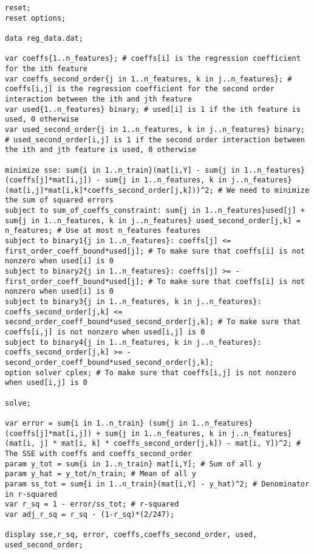 \documentclass[15pt,a4paper,openright]{article}
\begin{document}
\begin{lstlisting}[language=AMPL, caption=2g Code]
reset;
reset options;

data reg_data.dat;

var coeffs{1..n_features}; # coeffs[i] is the regression coefficient for the ith feature
var coeffs_second_order{j in 1..n_features, k in j..n_features}; # coeffs[i,j] is the regression coefficient for the second order interaction between the ith and jth feature
var used{1..n_features} binary; # used[i] is 1 if the ith feature is used, 0 otherwise
var used_second_order{j in 1..n_features, k in j..n_features} binary; # used_second_order[i,j] is 1 if the second order interaction between the ith and jth feature is used, 0 otherwise

minimize sse: sum{i in 1..n_train}(mat[i,Y] - sum{j in 1..n_features}(coeffs[j]*mat[i,j]) - sum{j in 1..n_features, k in j..n_features}(mat[i,j]*mat[i,k]*coeffs_second_order[j,k]))^2; # We need to minimize the sum of squared errors
subject to sum_of_coeffs_constraint: sum{j in 1..n_features}used[j] + sum{j in 1..n_features, k in j..n_features} used_second_order[j,k] = n_features; # Use at most n_features features
subject to binary1{j in 1..n_features}: coeffs[j] <= first_order_coeff_bound*used[j]; # To make sure that coeffs[i] is not nonzero when used[i] is 0
subject to binary2{j in 1..n_features}: coeffs[j] >= -first_order_coeff_bound*used[j]; # To make sure that coeffs[i] is not nonzero when used[i] is 0
subject to binary3{j in 1..n_features, k in j..n_features}: coeffs_second_order[j,k] <= second_order_coeff_bound*used_second_order[j,k]; # To make sure that coeffs[i,j] is not nonzero when used[i,j] is 0
subject to binary4{j in 1..n_features, k in j..n_features}: coeffs_second_order[j,k] >= -second_order_coeff_bound*used_second_order[j,k];
option solver cplex; # To make sure that coeffs[i,j] is not nonzero when used[i,j] is 0

solve;

var error = sum{i in 1..n_train} (sum{j in 1..n_features}(coeffs[j]*mat[i,j]) + sum{j in 1..n_features, k in j..n_features}(mat[i, j] * mat[i, k] * coeffs_second_order[j,k]) - mat[i, Y])^2; # The SSE with coeffs and coeffs_second_order
param y_tot = sum{i in 1..n_train} mat[i,Y]; # Sum of all y
param y_hat = y_tot/n_train; # Mean of all y
param ss_tot = sum{i in 1..n_train}(mat[i,Y] - y_hat)^2; # Denominator in r-squared
var r_sq = 1 - error/ss_tot; # r-squared
var adj_r_sq = r_sq - (1-r_sq)*(2/247);

display sse,r_sq, error, coeffs,coeffs_second_order, used, used_second_order;
\end{lstlisting}
\end{document}
